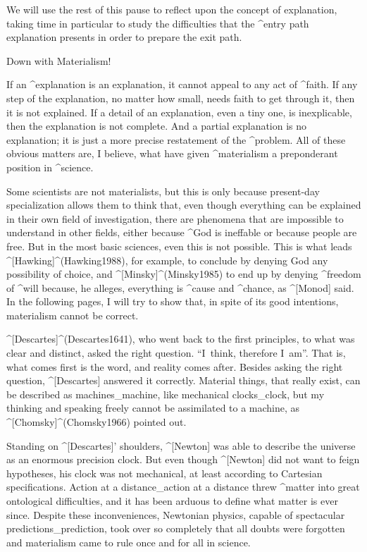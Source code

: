 We will use the rest of this pause to reflect upon the concept of
explanation, taking time in particular to study the difficulties that
the ^{entry path explanation} presents in order to prepare the exit
path.


\Section Down with Materialism!

If an ^{explanation} is an explanation, it cannot appeal to any act of
^{faith}. If any step of the explanation, no matter how small, needs
faith to get through it, then it is not explained. If a detail of an
explanation, even a tiny one, is inexplicable, then the explanation is
not complete. And a partial explanation is no explanation; it is just a
more precise restatement of the ^{problem}. All of these obvious matters
are, I believe, what have given ^{materialism} a preponderant position
in ^{science}.

Some scientists are not materialists, but this is only because
present-day specialization allows them to think that, even though
everything can be explained in their own field of investigation, there
are phenomena that are impossible to understand in other fields, either
because ^{God} is ineffable or because people are free. But in the most
basic sciences, even this is not possible. This is what leads
^[Hawking]^(Hawking1988), for example, to conclude by denying God any
possibility of choice, and ^[Minsky]^(Minsky1985) to end up by denying
^{freedom} of ^{will} because, he alleges, everything is ^{cause} and
^{chance}, as ^[Monod] said. In the following pages, I will try to show
that, in spite of its good intentions, materialism cannot be correct.


^[Descartes]^(Descartes1641), who went back to the first principles, to
what was clear and distinct, asked the right question. ``I~think,
therefore I~am''.  That is, what comes first is the word, and reality
comes after. Besides asking the right question, ^[Descartes] answered it
correctly. Material things, that really exist, can be described as
machines_{machine}, like mechanical clocks_{clock}, but my thinking and
speaking freely cannot be assimilated to a machine, as
^[Chomsky]^(Chomsky1966) pointed out.

Standing on ^[Descartes]' shoulders, ^[Newton] was able to describe the
universe as an enormous precision clock. But even though ^[Newton] did
not want to feign hypotheses, his clock was not mechanical, at least
according to Cartesian specifications. Action at a distance_{action at a
distance} threw ^{matter} into great ontological difficulties, and it
has been arduous to define what matter is ever since. Despite these
inconveniences, Newtonian physics, capable of spectacular
predictions_{prediction}, took over so completely that all doubts were
forgotten and materialism came to rule once and for all in science.

